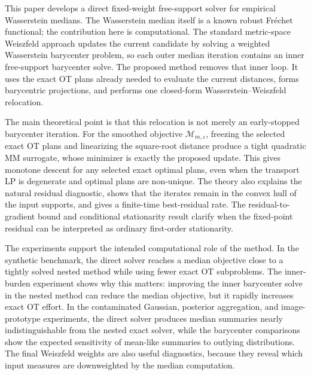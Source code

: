 \documentclass[pdflatex,sn-mathphys-ay]{sn-jnl}%
\theoremstyle{thmstyleone}%
\theoremstyle{thmstyletwo}%
\theoremstyle{thmstylethree}%
\newcommand{\calM}{\mathcal M}
\newcommand{\eps}{\varepsilon}
\begin{document}
This paper develops a direct fixed-weight free-support solver for empirical Wasserstein medians. The Wasserstein median itself is a known robust Fr\'echet functional; the contribution here is computational. The standard metric-space Weiszfeld approach updates the current candidate by solving a weighted Wasserstein barycenter problem, so each outer median iteration contains an inner free-support barycenter solve. The proposed method removes that inner loop. It uses the exact OT plans already needed to evaluate the current distances, forms barycentric projections, and performs one closed-form Wasserstein--Weiszfeld relocation.

The main theoretical point is that this relocation is not merely an early-stopped barycenter iteration. For the smoothed objective \(\calM_{m,\eps}\), freezing the selected exact OT plans and linearizing the square-root distance produce a tight quadratic MM surrogate, whose minimizer is exactly the proposed update. This gives monotone descent for any selected exact optimal plans, even when the transport LP is degenerate and optimal plans are non-unique. The theory also explains the natural residual diagnostic, shows that the iterates remain in the convex hull of the input supports, and gives a finite-time best-residual rate. The residual-to-gradient bound and conditional stationarity result clarify when the fixed-point residual can be interpreted as ordinary first-order stationarity.

The experiments support the intended computational role of the method. In the synthetic benchmark, the direct solver reaches a median objective close to a tightly solved nested method while using fewer exact OT subproblems. The inner-burden experiment shows why this matters: improving the inner barycenter solve in the nested method can reduce the median objective, but it rapidly increases exact OT effort. In the contaminated Gaussian, posterior aggregation, and image-prototype experiments, the direct solver produces median summaries nearly indistinguishable from the nested exact solver, while the barycenter comparisons show the expected sensitivity of mean-like summaries to outlying distributions. The final Weiszfeld weights are also useful diagnostics, because they reveal which input measures are downweighted by the median computation.
\end{document}
